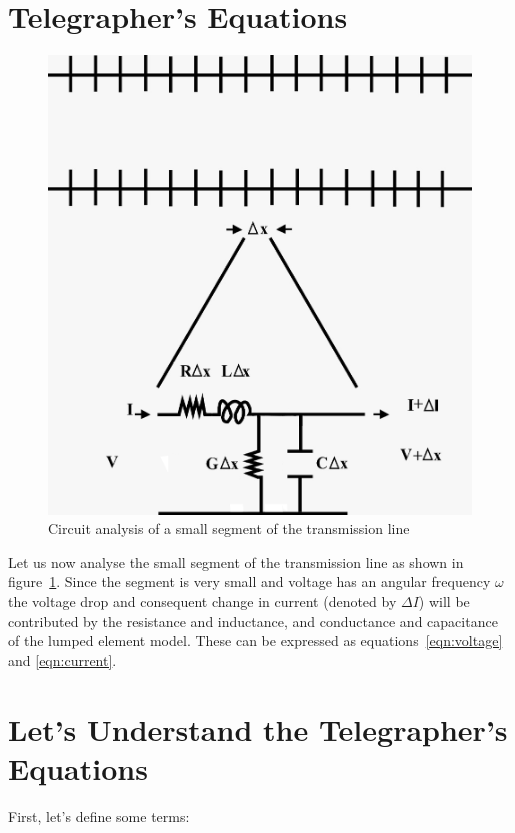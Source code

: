 \section{Telegrapher's Equations}
\begin{figure}[h]
\centering
\includegraphics[scale=0.2]{graphics/fig 2-11}
\caption{Circuit analysis of a small segment of the transmission line}
\label{fig:seventh}
\end{figure}




Let us now analyse the small segment of the transmission line as shown in figure~\ref{fig:seventh}. Since the segment is very small and voltage has an angular frequency $ \omega $ the voltage drop and consequent change in current (denoted by $\Delta I$) will be contributed by the resistance and inductance, and conductance and capacitance of the lumped element model. These can be expressed as equations~\eqref{eqn:voltage} and \eqref{eqn:current}.


\section{Let's Understand the Telegrapher's Equations}

First, let's define some terms:

